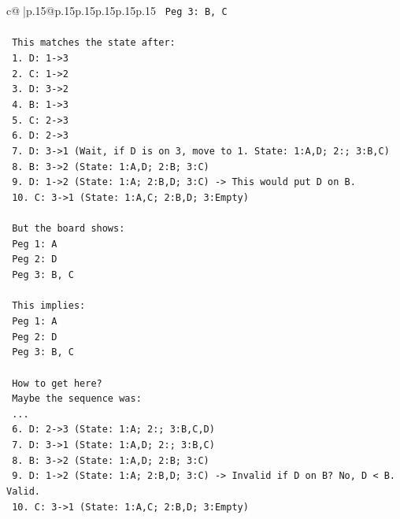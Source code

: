 \documentclass{article}
\begin{document}
{\begin{supertabular}{c@{$\;$}|p{.15\linewidth}@{}p{.15\linewidth}p{.15\linewidth}p{.15\linewidth}p{.15\linewidth}p{.15\linewidth}}
{{{\texttt{            Peg 3: B, C} \\
\\ 
\texttt{            This matches the state after:} \\
\texttt{            1. D: 1{-}>3} \\
\texttt{            2. C: 1{-}>2} \\
\texttt{            3. D: 3{-}>2} \\
\texttt{            4. B: 1{-}>3} \\
\texttt{            5. C: 2{-}>3} \\
\texttt{            6. D: 2{-}>3} \\
\texttt{            7. D: 3{-}>1 (Wait, if D is on 3, move to 1. State: 1:A,D; 2:; 3:B,C)} \\
\texttt{            8. B: 3{-}>2 (State: 1:A,D; 2:B; 3:C)} \\
\texttt{            9. D: 1{-}>2 (State: 1:A; 2:B,D; 3:C) {-}> This would put D on B.} \\
\texttt{            10. C: 3{-}>1 (State: 1:A,C; 2:B,D; 3:Empty)} \\
\\ 
\texttt{            But the board shows:} \\
\texttt{            Peg 1: A} \\
\texttt{            Peg 2: D} \\
\texttt{            Peg 3: B, C} \\
\\ 
\texttt{            This implies:} \\
\texttt{            Peg 1: A} \\
\texttt{            Peg 2: D} \\
\texttt{            Peg 3: B, C} \\
\\ 
\texttt{            How to get here?} \\
\texttt{            Maybe the sequence was:} \\
\texttt{            ...} \\
\texttt{            6. D: 2{-}>3 (State: 1:A; 2:; 3:B,C,D)} \\
\texttt{            7. D: 3{-}>1 (State: 1:A,D; 2:; 3:B,C)} \\
\texttt{            8. B: 3{-}>2 (State: 1:A,D; 2:B; 3:C)} \\
\texttt{            9. D: 1{-}>2 (State: 1:A; 2:B,D; 3:C) {-}> Invalid if D on B? No, D < B. Valid.} \\
\texttt{            10. C: 3{-}>1 (State: 1:A,C; 2:B,D; 3:Empty)} \\
}}}
\end{supertabular}}
\end{document}
